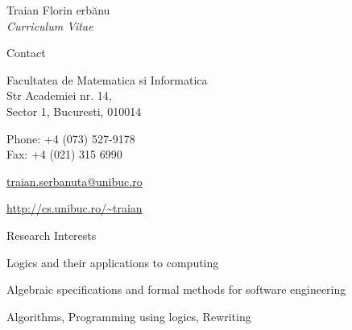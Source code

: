 \documentclass[10pt]{article}
\newcommand{\Sh}{\unichar{0536}}
\newcommand{\tz}{\unichar{0539}}
\newcommand{\Serbanuta}{{\Sh}er\-b{\u a}\-nu\-{\tz}{\u a}}
\begin{document}


\newlength{\oldcvlabelwidth}
\setlength{\oldcvlabelwidth}{\cvlabelwidth}

\renewcommand*{\cvbibname}{}

\begin{cv}{Traian Florin \Serbanuta{}\\{\large \itshape Curriculum Vitae}}

\begin{cvlist}{Contact}
    \item
	Facultatea de Matematica si Informatica\\
    Str Academiei nr. 14,\\
	Sector 1, Bucuresti, 010014
    \item Phone: +4 (073) 527-9178
    \\ Fax: +4 (021) 315 6990
    \item \href{mailto:traian.serbanuta@unibuc.ro}{traian.serbanuta@unibuc.ro}
    \item \href{http://cs.unibuc.ro/~traian}
    {\url{http://cs.unibuc.ro/~traian}}
\end{cvlist}

 {
\setlength{\cvlabelwidth}{1em}
\begin{cvlist}{Research Interests}
\item Logics and their applications to computing
\item Algebraic specifications and formal methods for software engineering
\item Algorithms, Programming using logics, Rewriting
\end{cvlist}
\setlength{\cvlabelwidth}{\oldcvlabelwidth}
} { 
}


\end{cv}
\end{document}
